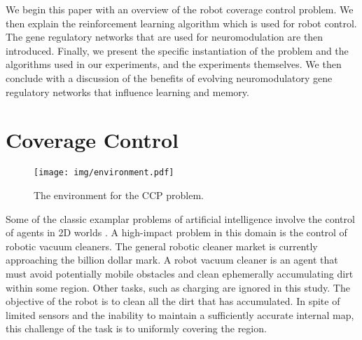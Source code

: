 \documentclass[conference]{IEEEtran}
\begin{document}
We begin this paper with an overview of the robot coverage control problem.
We then explain the reinforcement learning algorithm which is used for robot
control. The gene regulatory networks that are used for neuromodulation are then
introduced. Finally, we present the specific instantiation of the problem and
the algorithms used in our experiments, and the experiments themselves. We then
conclude with a discussion of the benefits of evolving neuromodulatory
gene regulatory networks that influence learning and memory.

\section{Coverage Control}

\begin{figure}
\texttt{[image: img/environment.pdf]}
\caption{The environment for the CCP problem.}
\label{fig:environment}
\end{figure}

Some of the classic examplar problems of artificial intelligence involve the
control of agents in 2D worlds \cite{Russell1995}. A high-impact
problem in this domain is the control of robotic vacuum cleaners. The general
robotic cleaner market is currently approaching the billion dollar mark. A robot
vacuum cleaner is an agent that must avoid potentially mobile obstacles and
clean ephemerally accumulating dirt within some region. Other tasks, such as
charging are ignored in this study. The objective of the robot is to clean all
the dirt that has accumulated. In spite of limited sensors and the inability to
maintain a sufficiently accurate internal map, this challenge of the task is to
uniformly covering the region.

\end{document}
